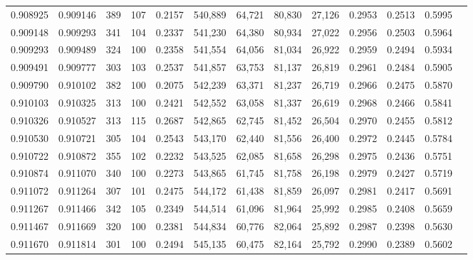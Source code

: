 \begin{tabular}{rrrrrrrrrrrrr}
0.908925 & 0.909146 &   389 & 107 &                                     0.2157 & 540,889 &  64,721 &  80,830 &  27,126 & 0.2953 & 0.2513 & 0.5995 \\
0.909148 & 0.909293 &   341 & 104 &                                     0.2337 & 541,230 &  64,380 &  80,934 &  27,022 & 0.2956 & 0.2503 & 0.5964 \\
0.909293 & 0.909489 &   324 & 100 &                                     0.2358 & 541,554 &  64,056 &  81,034 &  26,922 & 0.2959 & 0.2494 & 0.5934 \\
0.909491 & 0.909777 &   303 & 103 &                                     0.2537 & 541,857 &  63,753 &  81,137 &  26,819 & 0.2961 & 0.2484 & 0.5905 \\
0.909790 & 0.910102 &   382 & 100 &                                     0.2075 & 542,239 &  63,371 &  81,237 &  26,719 & 0.2966 & 0.2475 & 0.5870 \\
0.910103 & 0.910325 &   313 & 100 &                                     0.2421 & 542,552 &  63,058 &  81,337 &  26,619 & 0.2968 & 0.2466 & 0.5841 \\
0.910326 & 0.910527 &   313 & 115 &                                     0.2687 & 542,865 &  62,745 &  81,452 &  26,504 & 0.2970 & 0.2455 & 0.5812 \\
0.910530 & 0.910721 &   305 & 104 &                                     0.2543 & 543,170 &  62,440 &  81,556 &  26,400 & 0.2972 & 0.2445 & 0.5784 \\
0.910722 & 0.910872 &   355 & 102 &                                     0.2232 & 543,525 &  62,085 &  81,658 &  26,298 & 0.2975 & 0.2436 & 0.5751 \\
0.910874 & 0.911070 &   340 & 100 &                                     0.2273 & 543,865 &  61,745 &  81,758 &  26,198 & 0.2979 & 0.2427 & 0.5719 \\
0.911072 & 0.911264 &   307 & 101 &                                     0.2475 & 544,172 &  61,438 &  81,859 &  26,097 & 0.2981 & 0.2417 & 0.5691 \\
0.911267 & 0.911466 &   342 & 105 &                                     0.2349 & 544,514 &  61,096 &  81,964 &  25,992 & 0.2985 & 0.2408 & 0.5659 \\
0.911467 & 0.911669 &   320 & 100 &                                     0.2381 & 544,834 &  60,776 &  82,064 &  25,892 & 0.2987 & 0.2398 & 0.5630 \\
0.911670 & 0.911814 &   301 & 100 &                                     0.2494 & 545,135 &  60,475 &  82,164 &  25,792 & 0.2990 & 0.2389 & 0.5602 \\

\end{tabular}
